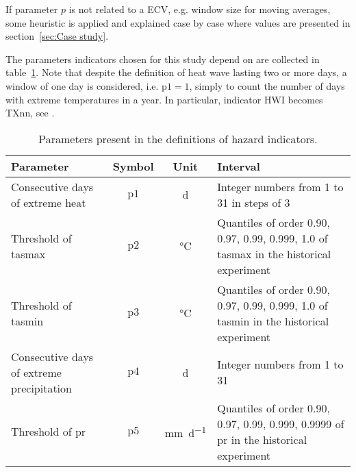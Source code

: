 If parameter $p$ is not related to a \gls{ECV}, e.g. window size for moving averages, some heuristic is applied and explained case by case where values are presented in section~\ref{sec:Case study}.

The parameters indicators chosen for this study depend on are collected in table~\ref{tab:indicators_parameters}. Note that despite the definition of heat wave lasting two or more days, a window of one day is considered, i.e. $\mathrm{p1} = 1$, simply to count the number of days with extreme temperatures in a year. In particular, indicator $\mathrm{HWI}$ becomes $\mathrm{TXnn}$, see \cite[2209]{2021GutierrezAnnexVI}.

\begin{table}[h]
  \renewcommand*{\arraystretch}{1.5}
  \centering
  \caption{Parameters present in the definitions of hazard indicators.}
  \label{tab:indicators_parameters}
  \begin{tabular}{p{}ccp{}}
    Parameter                                  & Symbol        & Unit                        & Interval                                                                                     \\
    \hline
    Consecutive days of extreme heat           & $\mathrm{p1}$ & \unit{\day}                 & Integer numbers from 1 to 31 in steps of 3                                                   \\  %
    Threshold of \gls{tasmax}                  & $\mathrm{p2}$ & \unit{\degreeCelsius}       & Quantiles of order 0.90, 0.97, 0.99, 0.999, 1.0 of \gls{tasmax} in the historical experiment \\
    Threshold of \gls{tasmin}                  & $\mathrm{p3}$ & \unit{\degreeCelsius}       & Quantiles of order 0.90, 0.97, 0.99, 0.999, 1.0 of \gls{tasmin} in the historical experiment \\
    Consecutive days of extreme precipitation  & $\mathrm{p4}$ & \unit{\day}                 & Integer numbers from 1 to 31                                                                 \\  %
    Threshold of \gls{pr}                      & $\mathrm{p5}$ & \unit{\milli\metre\per\day} & Quantiles of order 0.90, 0.97, 0.99, 0.999, 0.9999 of \gls{pr} in the historical experiment  \\
  \end{tabular}
\end{table}

